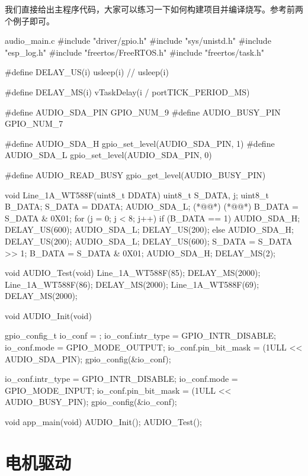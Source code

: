 \documentclass[lang=cn,newtx,10pt,scheme=chinese]{elegantbook}
\begin{document}
我们直接给出主程序代码，大家可以练习一下如何构建项目并编译烧写。参考前两个例子即可。

\begin{mycode}{audio\_main.c}
#include "driver/gpio.h"
#include "sys/unistd.h"
#include "esp_log.h"
#include "freertos/FreeRTOS.h"
#include "freertos/task.h"

#define DELAY_US(i) usleep(i) // usleep(i)

#define DELAY_MS(i) vTaskDelay(i / portTICK_PERIOD_MS)

#define AUDIO_SDA_PIN GPIO_NUM_9
#define AUDIO_BUSY_PIN GPIO_NUM_7

#define AUDIO_SDA_H gpio_set_level(AUDIO_SDA_PIN, 1)
#define AUDIO_SDA_L gpio_set_level(AUDIO_SDA_PIN, 0)

#define AUDIO_READ_BUSY gpio_get_level(AUDIO_BUSY_PIN)

void Line_1A_WT588F(uint8_t DDATA)
{
    uint8_t S_DATA, j;
    uint8_t B_DATA;
    S_DATA = DDATA;
    AUDIO_SDA_L;
    (*@@*) (*@@*)
    B_DATA = S_DATA & 0X01;
    for (j = 0; j < 8; j++)
    {
        if (B_DATA == 1)
        {
            AUDIO_SDA_H;
            DELAY_US(600);
            AUDIO_SDA_L;
            DELAY_US(200);
        }
        else
        {
            AUDIO_SDA_H;
            DELAY_US(200);
            AUDIO_SDA_L;
            DELAY_US(600);
        }
        S_DATA = S_DATA >> 1;
        B_DATA = S_DATA & 0X01;
    }
    AUDIO_SDA_H;
    DELAY_MS(2);
}

void AUDIO_Test(void)
{
    Line_1A_WT588F(85);
    DELAY_MS(2000);
    Line_1A_WT588F(86);
    DELAY_MS(2000);
    Line_1A_WT588F(69);
    DELAY_MS(2000);
}

void AUDIO_Init(void)
{
    gpio_config_t io_conf = {};
    io_conf.intr_type = GPIO_INTR_DISABLE;
    io_conf.mode = GPIO_MODE_OUTPUT;
    io_conf.pin_bit_mask = (1ULL << AUDIO_SDA_PIN);
    gpio_config(&io_conf);

    io_conf.intr_type = GPIO_INTR_DISABLE;
    io_conf.mode = GPIO_MODE_INPUT;
    io_conf.pin_bit_mask = (1ULL << AUDIO_BUSY_PIN);
    gpio_config(&io_conf);
}

void app_main(void)
{
    AUDIO_Init();
    AUDIO_Test();
}
\end{mycode}

\chapter{电机驱动}
\end{document}
